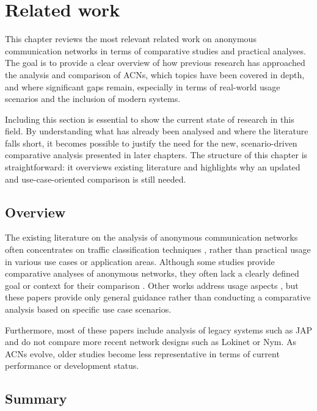\chapter{Related work}
\label{chap:Related}

This chapter reviews the most relevant related work on anonymous communication networks in terms of comparative studies and practical analyses. The goal is to provide a clear overview of how previous research has approached the analysis and comparison of ACNs, which topics have been covered in depth, and where significant gaps remain, especially in terms of real-world usage scenarios and the inclusion of modern systems.

Including this section is essential to show the current state of research in this field. By understanding what has already been analysed and where the literature falls short, it becomes possible to justify the need for the new, scenario-driven comparative analysis presented in later chapters. The structure of this chapter is straightforward: it overviews existing literature and highlights why an updated and use-case-oriented comparison is still needed.

\section{Overview}

The existing literature on the analysis of anonymous communication networks often concentrates on traffic classification techniques \cite{analysis-classification-jap, analysis-hierarchical-traffic-classification-jap, analysis-packet-momentum-identification-jap, analysis-phd-thesis-identification-jap}, rather than practical usage in various use cases or application areas. Although some studies provide comparative analyses of anonymous networks, they often lack a clearly defined goal or context for their comparison \cite{analysis-tor-vs-i2p}. Other works address usage aspects \cite{analysis-tools-usage-jap, analysis-acn-usage-jap-old}, but these papers provide only general guidance rather than conducting a comparative analysis based on specific use case scenarios.

Furthermore, most of these papers include analysis of legacy systems such as JAP and do not compare more recent network designs such as Lokinet or Nym. As ACNs evolve, older studies become less representative in terms of current performance or development status.

\section{Summary}

